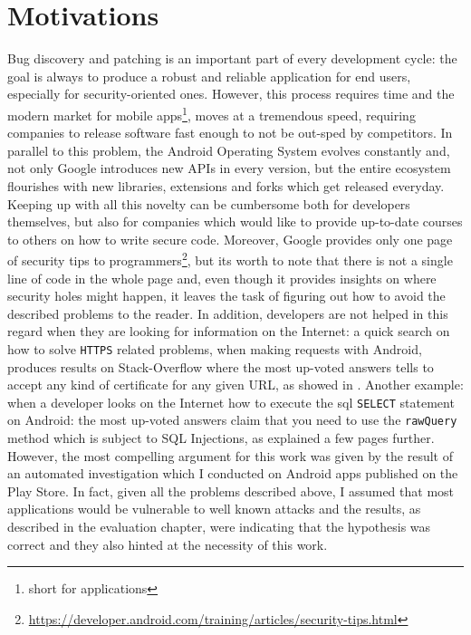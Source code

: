 \section{Motivations}
Bug discovery and patching is an important part of every development cycle: the goal is always to produce a robust and reliable application for end users, especially for security-oriented ones. However, this process requires time and the modern market for mobile apps\footnote{short for applications}, moves at a tremendous speed, requiring companies to release software fast enough to not be out-sped by competitors. In parallel to this problem, the Android Operating System evolves constantly and, not only Google introduces new APIs in every version, but the entire ecosystem flourishes with new libraries, extensions and forks which get released everyday.
Keeping up with all this novelty can be cumbersome both for developers themselves, but also for companies which would like to provide up-to-date courses to others on how to write secure code. Moreover, Google provides only one page of security tips to programmers\footnote{\url{https://developer.android.com/training/articles/security-tips.html}}, but its worth to note that there is not a single line of code in the whole page and, even though it provides insights on where security holes might happen,  it leaves the task of figuring out how to avoid the described problems to the reader. In addition, developers are not helped in this regard when they are looking for information on the Internet: a quick search on how to solve \texttt{HTTPS} related problems, when making requests with Android, produces results on Stack-Overflow where the most up-voted answers tells to accept any kind of certificate for any given URL, as showed in \cite{svm-hunter}. Another example: when a developer looks on the Internet how to execute the sql \texttt{SELECT} statement on Android: the most up-voted answers claim that you need to use the \texttt{rawQuery} method which is subject to SQL Injections, as explained a few pages further. However, the most compelling argument for this work was given by the result of an automated investigation which I conducted on Android apps published on the Play Store. In fact, given all the problems described above, I assumed that most applications would be vulnerable to well known attacks and the results, as described in the evaluation chapter, were indicating that the hypothesis was correct and they also hinted at the necessity of this work. 

